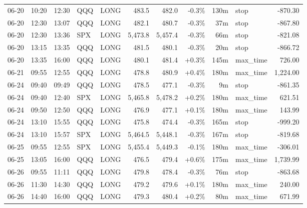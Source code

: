 \documentclass[11pt,a4paper,twoside]{article}
\begin{document}
\begin{center}
\begin{longtable}{>{\color{txtmain}}l l l l l r r r r >{\color{txtmain}}l r}
06-20 & 10:20 & 12:30 & QQQ & LONG & 483.5 & 482.0 & \textcolor{lossred}{-0.3\%} & 130m & stop & \textcolor{lossred}{-870.30} \\
06-20 & 12:30 & 13:07 & QQQ & LONG & 482.1 & 480.7 & \textcolor{lossred}{-0.3\%} & 37m & stop & \textcolor{lossred}{-867.80} \\
06-20 & 12:30 & 13:36 & SPX & LONG & 5,473.8 & 5,457.4 & \textcolor{lossred}{-0.3\%} & 66m & stop & \textcolor{lossred}{-821.08} \\
06-20 & 13:15 & 13:35 & QQQ & LONG & 481.5 & 480.1 & \textcolor{lossred}{-0.3\%} & 20m & stop & \textcolor{lossred}{-866.72} \\
06-20 & 13:35 & 16:00 & QQQ & LONG & 480.1 & 481.4 & \textcolor{wingreen}{+0.3\%} & 145m & max\_time & \textcolor{wingreen}{726.00} \\
06-21 & 09:55 & 12:55 & QQQ & LONG & 478.8 & 480.9 & \textcolor{wingreen}{+0.4\%} & 180m & max\_time & \textcolor{wingreen}{1,224.00} \\
06-24 & 09:40 & 09:49 & QQQ & LONG & 478.5 & 477.1 & \textcolor{lossred}{-0.3\%} & 9m & stop & \textcolor{lossred}{-861.35} \\
06-24 & 09:40 & 12:40 & SPX & LONG & 5,465.8 & 5,478.2 & \textcolor{wingreen}{+0.2\%} & 180m & max\_time & \textcolor{wingreen}{621.51} \\
06-24 & 09:50 & 12:50 & QQQ & LONG & 476.9 & 477.1 & \textcolor{wingreen}{+0.1\%} & 180m & max\_time & \textcolor{wingreen}{143.99} \\
06-24 & 13:10 & 15:55 & QQQ & LONG & 475.8 & 474.4 & \textcolor{lossred}{-0.3\%} & 165m & stop & \textcolor{lossred}{-999.20} \\
06-24 & 13:10 & 15:57 & SPX & LONG & 5,464.5 & 5,448.1 & \textcolor{lossred}{-0.3\%} & 167m & stop & \textcolor{lossred}{-819.68} \\
06-25 & 09:55 & 12:55 & SPX & LONG & 5,455.4 & 5,449.3 & \textcolor{lossred}{-0.1\%} & 180m & max\_time & \textcolor{lossred}{-306.01} \\
06-25 & 13:05 & 16:00 & QQQ & LONG & 476.5 & 479.4 & \textcolor{wingreen}{+0.6\%} & 175m & max\_time & \textcolor{wingreen}{1,739.99} \\
06-26 & 09:55 & 11:11 & QQQ & LONG & 479.8 & 478.4 & \textcolor{lossred}{-0.3\%} & 76m & stop & \textcolor{lossred}{-863.68} \\
06-26 & 11:30 & 14:30 & QQQ & LONG & 479.2 & 479.6 & \textcolor{wingreen}{+0.1\%} & 180m & max\_time & \textcolor{wingreen}{240.00} \\
06-26 & 14:40 & 16:00 & QQQ & LONG & 479.3 & 480.4 & \textcolor{wingreen}{+0.2\%} & 80m & max\_time & \textcolor{wingreen}{671.99} \\

\end{longtable}
\end{center}
\end{document}
